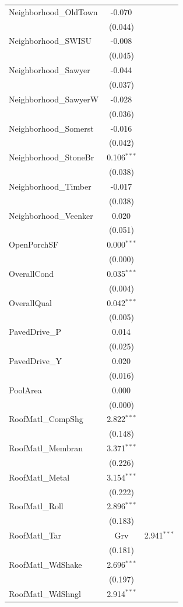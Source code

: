 \begin{table}[!htbp]
\begin{tabular}{@{\extracolsep{5pt}}lc}
 Neighborhood\_OldTown & -0.070$^{}$ \\
& (0.044) \\
 Neighborhood\_SWISU & -0.008$^{}$ \\
& (0.045) \\
 Neighborhood\_Sawyer & -0.044$^{}$ \\
& (0.037) \\
 Neighborhood\_SawyerW & -0.028$^{}$ \\
& (0.036) \\
 Neighborhood\_Somerst & -0.016$^{}$ \\
& (0.042) \\
 Neighborhood\_StoneBr & 0.106$^{***}$ \\
& (0.038) \\
 Neighborhood\_Timber & -0.017$^{}$ \\
& (0.038) \\
 Neighborhood\_Veenker & 0.020$^{}$ \\
& (0.051) \\
 OpenPorchSF & 0.000$^{***}$ \\
& (0.000) \\
 OverallCond & 0.035$^{***}$ \\
& (0.004) \\
 OverallQual & 0.042$^{***}$ \\
& (0.005) \\
 PavedDrive\_P & 0.014$^{}$ \\
& (0.025) \\
 PavedDrive\_Y & 0.020$^{}$ \\
& (0.016) \\
 PoolArea & 0.000$^{}$ \\
& (0.000) \\
 RoofMatl\_CompShg & 2.822$^{***}$ \\
& (0.148) \\
 RoofMatl\_Membran & 3.371$^{***}$ \\
& (0.226) \\
 RoofMatl\_Metal & 3.154$^{***}$ \\
& (0.222) \\
 RoofMatl\_Roll & 2.896$^{***}$ \\
& (0.183) \\
 RoofMatl\_Tar&Grv & 2.941$^{***}$ \\
& (0.181) \\
 RoofMatl\_WdShake & 2.696$^{***}$ \\
& (0.197) \\
 RoofMatl\_WdShngl & 2.914$^{***}$ \\

\end{tabular}
\end{table}
